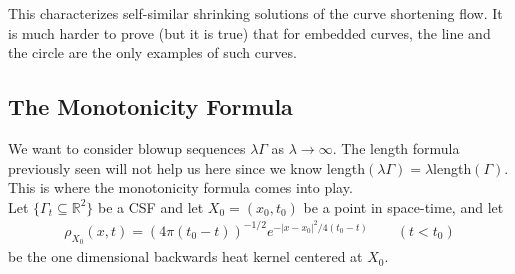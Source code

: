 \documentclass{article}
\begin{document}
This characterizes self-similar shrinking solutions of the curve shortening flow. It is much harder to prove (but it is true) that for embedded curves,
the line and the circle are the only examples of such curves.

\subsection{The Monotonicity Formula}

We want to consider blowup sequences $\lambda \Gamma$ as $\lambda\to\infty$. The length formula previously seen will not help us here since we know
length$(\lambda\Gamma) = \lambda$length$(\Gamma)$. This is where the monotonicity formula comes into play.\\

Let $\{\Gamma_t \subseteq \mathbb{R}^2\}$ be a CSF and let $X_0 = (x_0,t_0)$ be a point in space-time, and let
\begin{align}
	\rho_{X_0}(x,t) = (4\pi (t_0 - t))^{-1/2}e^{-|x-x_0|^2/4(t_0-t)}\qquad (t < t_0)
\end{align}
be the one dimensional backwards heat kernel centered at $X_0$.
\end{document}
